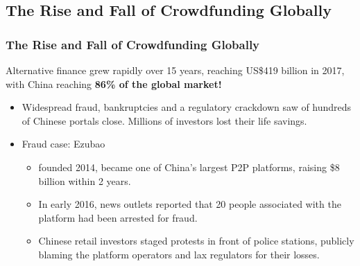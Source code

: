 \documentclass[aspectratio=169,xcolor=dvipsnames]{beamer}
\begin{document}
\subsection{The Rise and Fall of Crowdfunding Globally}






\begin{frame}
\frametitle{The Rise and Fall of Crowdfunding Globally}


Alternative finance grew rapidly over 15 years, reaching US\$419 billion in 2017, with China reaching \textbf{86\% of the global market!} 

\medskip

\begin{itemize}
    \item Widespread fraud, bankruptcies and a regulatory crackdown saw of hundreds of Chinese portals close. Millions of investors lost their life savings.
    \medskip 
    
    \item Fraud case: Ezubao
    \begin{itemize}
        \item founded 2014, became one of China’s largest P2P platforms, raising \$8 billion within 2 years.
        \smallskip 
        \item In early 2016, news outlets reported that 20 people associated with the platform had been arrested for fraud. 
        \smallskip 
        \item Chinese retail investors staged protests in front of police stations, publicly blaming the platform operators and lax regulators for their losses.
    \end{itemize}
\end{itemize}

\end{frame} 
\end{document}
